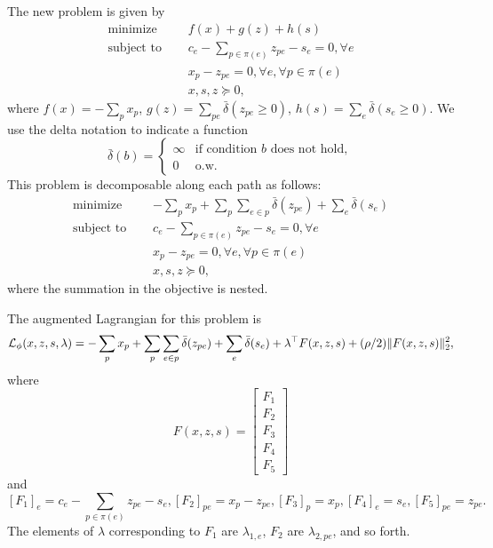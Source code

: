 \documentclass[11pt]{article}
\begin{document}
The new problem is given by
\begin{equation}
\label{eqn:network-opt-std}
\begin{aligned}
\textrm{minimize } \quad & f(x) + g(z) + h(s)\\
\textrm{subject to } \quad &c_e - \sum_{p\in\pi(e)}z_{pe} - s_{e} = 0, \forall e\\
&x_p - z_{pe} = 0, \forall e, \forall p \in \pi(e)\\
&x,s,z \succeq 0,
\end{aligned}
\end{equation}
where $f(x) = -\sum_p x_p$,
$g(z) = \sum_{pe} \bar\delta(z_{pe} \ge 0)$, $h(s) = \sum_{e} \bar\delta(s_{e} \ge 0)$.
We use the delta notation to indicate a function
$$
\bar\delta(b) = \begin{cases}
    \infty & \textrm{if condition } b \textrm{ does not hold},\\
    0 & \textrm{o.w.}
\end{cases}
$$
This problem is decomposable along each path as follows:
\begin{equation}
\label{eqn:network-opt-sep}
\begin{aligned}
\textrm{minimize } \quad & -\sum_p x_p + \sum_p\sum_{e \in p} \bar\delta(z_{pe}) + \sum_e \bar\delta(s_{e})\\
\textrm{subject to } \quad &c_e - \sum_{p\in\pi(e)}z_{pe} - s_{e} = 0, \forall e\\
&x_p - z_{pe} = 0, \forall e, \forall p \in \pi(e)\\
&x,s,z \succeq 0,
\end{aligned}
\end{equation}
where the summation in the objective is nested.

The augmented Lagrangian for this problem is
\begin{equation}
    \label{eqn:network-lagrangian}
    \mathcal{L}_\phi(x,z,s,\lambda) =-\sum_p x_p + \sum_p\sum_{e \in p} \bar\delta(z_{pe}) + \sum_{e} \bar\delta(s_{e})
        + \lambda^\top F(x,z,s)
    + (\rho/2)\| F(x,z,s) \|_2^2,
\end{equation}
where
$$F(x,z,s) =
\begin{bmatrix}
F_1 \\
F_2 \\
F_3 \\
F_4 \\
F_5
\end{bmatrix}
$$
and
$$
    [F_1]_e = c_e - \sum_{p\in\pi(e)}z_{pe} - s_{e},
    [F_2]_{pe} = x_p - z_{pe},
    [F_3]_p = x_p,
    [F_4]_{e} = s_{e},
    [F_5]_{pe} = z_{pe}.
$$
The elements of $\lambda$ corresponding to $F_1$ are $\lambda_{1,e}$,
$F_2$ are $\lambda_{2,pe}$, and so forth.
\end{document}
